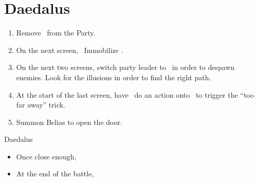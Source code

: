 \chapter{Daedalus}

\begin{enumerate}
\vaanf Remedy \vaan, if he didn't block Nectar Volley
\penelof Dispell Penelo
\ashef Hi-Potion \vaan\ if needed
\item Remove \ashe\ from the Party.
\item On the next screen, \penelo\ Immobilize \penelo.
\item On the next two screens, switch party leader to \penelo\ in order to despawn enemies. Look for the illusions in order to find the right path.
\item At the start of the last screen, have \penelo\ do an action onto \vaan\ to trigger the ``too far away'' trick.
\item Summon Belias to open the door.
\end{enumerate}
\begin{menu}
\party{\balthier, \ashe, \penelo}
\end{menu}
\begin{equip}
\begin{itemize}
\optimize{\penelo, \ashe}
\end{itemize}
\end{equip}
\begin{gambit}
	\begin{itemize}
	\end{itemize}
\end{gambit}
\begin{battle}{Daedalus}
	\begin{itemize}
	\penelof Dispell \ashe
	\penelof Reflect \penelo
	\ashef Reflect \balthier
	\ashef Reflect \ashe
	\balthierf Spam Confuse on  and run in circles to regenerate MP
	\item Once close enough, \GirlsGambitOn
	\item At the end of the battle, \GirlsGambitOff
	\end{itemize}
\end{battle}